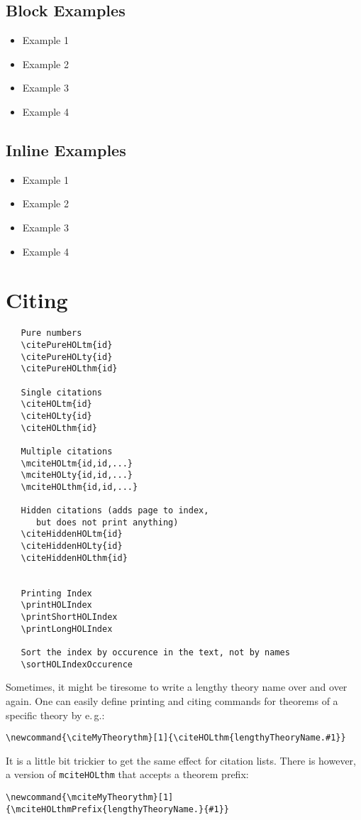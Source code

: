 \documentclass{scrartcl}
\begin{document}
\subsection{Block Examples}
\begin{itemize}
\item Example 1 
\item Example 2 
\item Example 3 
\item Example 4 
\end{itemize}


\subsection{Inline Examples}
\begin{itemize}
\item Example 1 
\item Example 2 
\item Example 3 
\item Example 4 
\end{itemize}



\section{Citing}

\begin{verbatim}
   Pure numbers
   \citePureHOLtm{id}
   \citePureHOLty{id}
   \citePureHOLthm{id}

   Single citations
   \citeHOLtm{id}
   \citeHOLty{id}
   \citeHOLthm{id}

   Multiple citations 
   \mciteHOLtm{id,id,...}
   \mciteHOLty{id,id,...}
   \mciteHOLthm{id,id,...}

   Hidden citations (adds page to index, 
      but does not print anything)
   \citeHiddenHOLtm{id}
   \citeHiddenHOLty{id}
   \citeHiddenHOLthm{id}


   Printing Index 
   \printHOLIndex
   \printShortHOLIndex 
   \printLongHOLIndex 

   Sort the index by occurence in the text, not by names
   \sortHOLIndexOccurence
\end{verbatim}

Sometimes, it might be tiresome to write a lengthy theory name over and over again.
One can easily define printing and citing commands for theorems of a specific
theory by e.\,g.:
\begin{verbatim}
\newcommand{\citeMyTheorythm}[1]{\citeHOLthm{lengthyTheoryName.#1}}
\end{verbatim}
It is a little bit trickier to get the same effect for citation lists. There is however,
a version of \texttt{mciteHOLthm} that accepts a theorem prefix:
\begin{verbatim}
\newcommand{\mciteMyTheorythm}[1]{\mciteHOLthmPrefix{lengthyTheoryName.}{#1}}
\end{verbatim}
\end{document}
